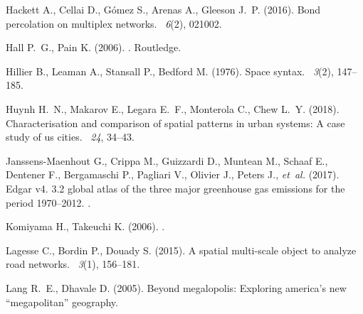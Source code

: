 \documentclass{jimis-en}
\begin{document}
\begin{thebibliography}{}
Hackett A., Cellai D., G{\'o}mez S., Arenas A., Gleeson J.~P. (2016).
\newblock Bond percolation on multiplex networks.
~{\em 6\/}(2), 021002.


Hall P.~G., Pain K. (2006).
.
\newblock Routledge.


Hillier B., Leaman A., Stansall P., Bedford M. (1976).
\newblock Space syntax.
~{\em 3\/}(2),
  147--185.


Huynh H.~N., Makarov E., Legara E.~F., Monterola C., Chew L.~Y. (2018).
\newblock Characterisation and comparison of spatial patterns in urban systems:
  A case study of us cities.
~{\em 24}, 34--43.


Janssens-Maenhout G., Crippa M., Guizzardi D., Muntean M., Schaaf E., Dentener
  F., Bergamaschi P., Pagliari V., Olivier J., Peters J., \textit{et~al.}
  (2017).
\newblock Edgar v4. 3.2 global atlas of the three major greenhouse gas
  emissions for the period 1970--2012.
.


Komiyama H., Takeuchi K. (2006).
.


Lagesse C., Bordin P., Douady S. (2015).
\newblock A spatial multi-scale object to analyze road networks.
~{\em 3\/}(1), 156--181.


Lang R.~E., Dhavale D. (2005).
\newblock Beyond megalopolis: Exploring america’s new “megapolitan”
  geography.



\end{thebibliography}
\end{document}
